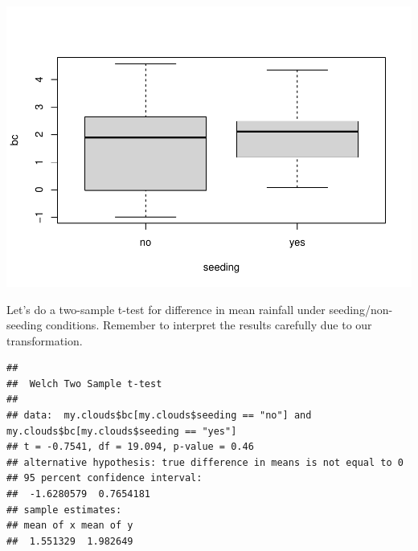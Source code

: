 \documentclass[
]{book}
\newenvironment{Shaded}{\begin{snugshade}}{\end{snugshade}}
\newcommand{\AttributeTok}[1]{\textcolor[rgb]{0.77,0.63,0.00}{#1}}
\newcommand{\FunctionTok}[1]{\textcolor[rgb]{0.00,0.00,0.00}{#1}}
\newcommand{\NormalTok}[1]{#1}
\newcommand{\OtherTok}[1]{\textcolor[rgb]{0.56,0.35,0.01}{#1}}
\newcommand{\SpecialCharTok}[1]{\textcolor[rgb]{0.00,0.00,0.00}{#1}}
\newcommand{\StringTok}[1]{\textcolor[rgb]{0.31,0.60,0.02}{#1}}
\begin{document}
\includegraphics{04-Non-Normal-Responses_files/figure-latex/unnamed-chunk-3-2.pdf}

Let's do a two-sample t-test for difference in mean rainfall under seeding/non-seeding conditions. Remember to interpret the results carefully due to our transformation.

\begin{Shaded}
\end{Shaded}

\begin{verbatim}
## 
##  Welch Two Sample t-test
## 
## data:  my.clouds$bc[my.clouds$seeding == "no"] and my.clouds$bc[my.clouds$seeding == "yes"]
## t = -0.7541, df = 19.094, p-value = 0.46
## alternative hypothesis: true difference in means is not equal to 0
## 95 percent confidence interval:
##  -1.6280579  0.7654181
## sample estimates:
## mean of x mean of y 
##  1.551329  1.982649
\end{verbatim}
\end{document}
